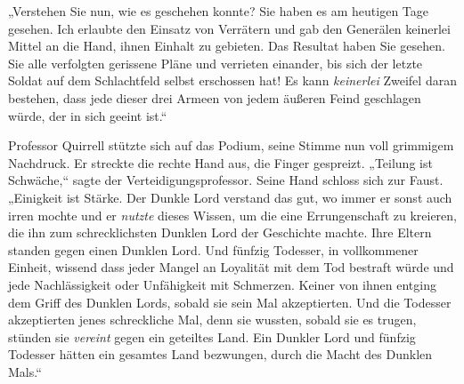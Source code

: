 „Verstehen Sie nun, wie es geschehen konnte? Sie haben es am heutigen Tage gesehen. Ich erlaubte den Einsatz von Verrätern und gab den Generälen keinerlei Mittel an die Hand, ihnen Einhalt zu gebieten. Das Resultat haben Sie gesehen. Sie alle verfolgten gerissene Pläne und verrieten einander, bis sich der letzte Soldat auf dem Schlachtfeld selbst erschossen hat! Es kann \emph{keinerlei} Zweifel daran bestehen, dass jede dieser drei Armeen von jedem äußeren Feind geschlagen würde, der in sich geeint ist.“

Professor Quirrell stützte sich auf das Podium, seine Stimme nun voll grimmigem Nachdruck. Er streckte die rechte Hand aus, die Finger gespreizt. „Teilung ist Schwäche,“ sagte der Verteidigungsprofessor. Seine Hand schloss sich zur Faust. „Einigkeit ist Stärke. Der Dunkle Lord verstand das gut, wo immer er sonst auch irren mochte und er \emph{nutzte} dieses Wissen, um die eine Errungenschaft zu kreieren, die ihn zum schrecklichsten Dunklen Lord der Geschichte machte. Ihre Eltern standen gegen einen Dunklen Lord. Und fünfzig Todesser, in vollkommener Einheit, wissend dass jeder Mangel an Loyalität mit dem Tod bestraft würde und jede Nachlässigkeit oder Unfähigkeit mit Schmerzen. Keiner von ihnen entging dem Griff des Dunklen Lords, sobald sie sein Mal akzeptierten. Und die Todesser akzeptierten jenes schreckliche Mal, denn sie wussten, sobald sie es trugen, stünden sie \emph{vereint} gegen ein geteiltes Land. Ein Dunkler Lord und fünfzig Todesser hätten ein gesamtes Land bezwungen, durch die Macht des Dunklen Mals.“

